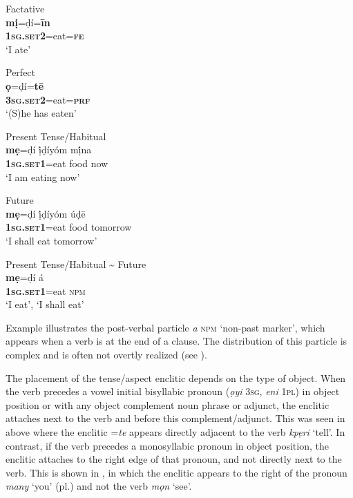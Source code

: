 \documentclass[output=paper]{langsci/langscibook}
\begin{document}
\ea\label{ex:rolle:3}
Factative\\
\gll  \textbf{mị}=ḍí=\textbf{īn}\\
     \textbf{\textsc{1sg.set2}}=eat=\textbf{\textsc{fe}}\\
\glt ‘I ate’ \citep[44]{Kari1997}
\z

\ea\label{ex:rolle:4}
Perfect\\
\gll  \textbf{ọ}=ḍí=\textbf{tē}\\
     \textbf{\textsc{3sg.set2}}=eat=\textbf{\textsc{prf}}\\
\glt ‘(S)he has eaten’ \citep[284]{Kari2004}
\z

\ea\label{ex:rolle:5}
Present Tense/Habitual\\
\gll  \textbf{mẹ}=ḍí     ị́ḍíyóm   m\'ịna\\
     \textbf{\textsc{1sg.set1}}=eat   food   now\\
\glt ‘I am eating now’ \citep[45]{Kari1997}
\z

\ea\label{ex:rolle:6}
Future\\
\gll  \textbf{mẹ}=ḍí     ị́ḍíyóm   úḍē\\
     \textbf{\textsc{1sg.set1}}=eat   food   tomorrow\\
\glt ‘I shall eat tomorrow’ \citep[45]{Kari1997}
\z

\ea\label{ex:rolle:7}
Present Tense/Habitual {\textasciitilde} Future\\
\gll  \textbf{mẹ}=ḍí     á\\
     \textbf{\textsc{1sg.set1}}=eat  \textsc{npm}\\
\glt ‘I eat’, ‘I shall eat’ \citep[45]{Kari1997}
\z

Example  illustrates the post-verbal particle \textit{a} \textsc{npm} ‘non-past marker’, which appears when a verb is at the end of a clause. The distribution of this particle is complex and is often not overtly realized (see \citealt[278--280]{Kari2004}).

The placement of the tense/aspect enclitic depends on the type of object. When the verb precedes a vowel initial bisyllabic pronoun (\textit{ọyi} \textsc{3sg}, \textit{eni} \textsc{1pl}) in object position or with any object complement noun phrase or adjunct, the enclitic attaches next to the verb and before this complement/adjunct. This was seen in  above where the enclitic =\textit{te} appears directly adjacent to the verb \textit{kpẹri} ‘tell’. In contrast, if the verb precedes a monosyllabic pronoun in object position, the enclitic attaches to the right edge of that pronoun, and not directly next to the verb. This is shown in , in which the enclitic appears to the right of the pronoun \textit{many} ‘you’ (pl.) and not the verb \textit{mọn} ‘see’.
\end{document}
